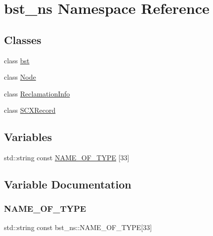 \hypertarget{namespacebst__ns}{}\section{bst\+\_\+ns Namespace Reference}
\label{namespacebst__ns}
\subsection*{Classes}
\begin{DoxyCompactItemize}
\item 
class \hyperlink{classbst__ns_1_1bst}{bst}
\item 
class \hyperlink{classbst__ns_1_1Node}{Node}
\item 
class \hyperlink{classbst__ns_1_1ReclamationInfo}{Reclamation\+Info}
\item 
class \hyperlink{classbst__ns_1_1SCXRecord}{S\+C\+X\+Record}
\end{DoxyCompactItemize}
\subsection*{Variables}
\begin{DoxyCompactItemize}
\item 
std\+::string const \hyperlink{namespacebst__ns_a16dacc6c3e46653541fdd6add0da513d}{N\+A\+M\+E\+\_\+\+O\+F\+\_\+\+T\+Y\+PE} \mbox{[}33\mbox{]}
\end{DoxyCompactItemize}


\subsection{Variable Documentation}
\mbox{\label{namespacebst__ns_a16dacc6c3e46653541fdd6add0da513d}} 
\subsubsection{\texorpdfstring{N\+A\+M\+E\+\_\+\+O\+F\+\_\+\+T\+Y\+PE}{NAME\_OF\_TYPE}}
{\footnotesize\ttfamily std\+::string const bst\+\_\+ns\+::\+N\+A\+M\+E\+\_\+\+O\+F\+\_\+\+T\+Y\+PE\mbox{[}33\mbox{]}}

